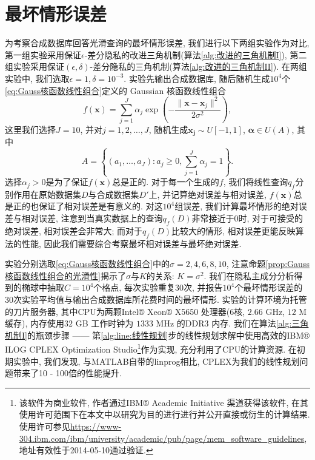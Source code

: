 \section{最坏情形误差} %
\label{sec:最坏情形误差}
为考察合成数据库回答光滑查询的最坏情形误差, 我们进行以下两组实验作为对比, 第一组实验采用保证$\epsilon$-差分隐私的改进三角机制(算法\ref{alg:改进的三角机制I}), 第二组实验采用保证$(\epsilon, \delta)$-差分隐私的三角机制(算法\ref{alg:改进的三角机制II}). 在两组实验中, 我们选取$\epsilon = 1, \delta = 10^{-3}$. 实验先输出合成数据库, 随后随机生成$10^4$个\eqref{eq:Gauss核函数线性组合}定义的 Gaussian 核函数线性组合
\[
  f(\mathbf{x}) = \sum_{j = 1}^J \alpha_j \exp\left(-\frac{\|\mathbf{x} - \mathbf{x}_j\|^2}{2\sigma^2}\right), 
\]
这里我们选择$J = 10$, 并对$j = 1, 2, \dots, J$, 随机生成$\mathbf{x_j} \sim U[-1, 1]$, $\boldsymbol{\alpha} \in U(A)$, 其中
\[
  A = \left\{(a_1, \dots, a_J)\colon a_j\ge 0, \sum_{j=1}^J \alpha_j = 1 \right\}.
\]
选择$\alpha_j > 0$是为了保证$f(\mathbf{x})$总是正的. 对于每一个生成的$f$, 我们将线性查询$q_f$分别作用在原始数据集$D$与合成数据集$D'$上, 并记算绝对误差与相对误差, $f(\mathbf{x})$总是正的也保证了相对误差是有意义的.  对这$10^4$组误差, 我们计算最坏情形的绝对误差与相对误差, 注意到当真实数据上的查询$q_f(D)$非常接近于$0$时, 对于可接受的绝对误差, 相对误差会非常大; 而对于$q_f(D)$比较大的情形, 相对误差更能反映算法的性能, 因此我们需要综合考察最坏相对误差与最坏绝对误差. 

实验分别选取\eqref{eq:Gauss核函数线性组合}中的$\sigma = 2, 4, 6, 8, 10$, 注意命题\ref{prop:Gauss 核函数线性组合的光滑性}揭示了$\sigma$与$K$的关系: $K = \sigma^2$. 我们在隐私主成分分析得到的椭球中抽取$C = 10^4$个格点, 每次实验重复$30$次, 并报告$10^4$个最坏情形误差的$30$次实验平均值与输出合成数据库所花费时间的最坏情形. 实验的计算环境为托管的刀片服务器, 其中CPU为两颗Intel®  Xeon®  X5650 处理器($6$核, $2.66$ GHz, $12$ M缓存), 内存使用$32$ GB 工作时钟为 $1333$ MHz 的DDR3 内存. 我们在算法\ref{alg:三角机制I}的瓶颈步骤 ------ 第\ref{alg:line:线性规划}步的线性规划求解中使用高效的IBM® ILOG CPLEX Optimization Studio\footnote{该软件为商业软件, 作者通过IBM® Academic Initiative 渠道获得该软件, 在其使用许可范围下在本文中以研究为目的进行进行并公开直接或衍生的计算结果. 使用许可参见\url{https://www-304.ibm.com/ibm/university/academic/pub/page/mem_software_guidelines}, 地址有效性于2014-05-10通过验证.}作为实现, 充分利用了CPU的计算资源. 在初期实验中, 我们发现, 与MATLAB自带的{\ttfamily linprog}相比, CPLEX为我们的线性规划问题带来了10 - 100倍的性能提升.

